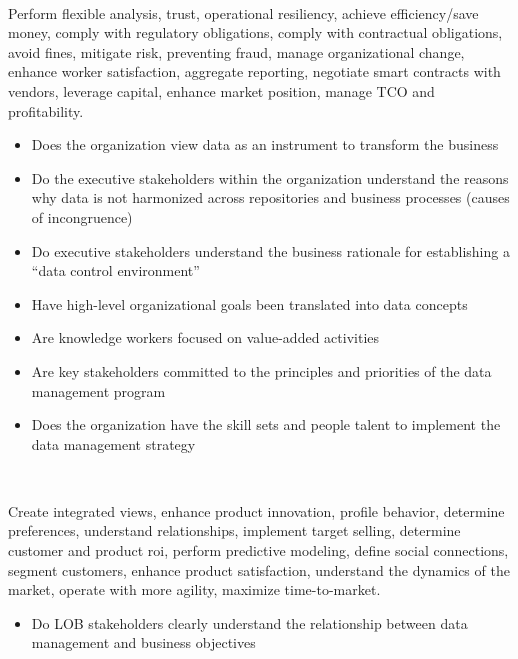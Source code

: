 ~\\

\begin{description}[nosep,font=\bfseries]

  \item [High-level Organizational Goals]
  Perform flexible analysis, trust, operational resiliency, achieve efficiency/\-save money, 
  comply with regulatory obligations, comply with contractual obligations, avoid fines, 
  mitigate risk, preventing fraud, manage organizational change, enhance worker satisfaction,
  aggregate reporting, negotiate smart contracts with vendors, leverage capital, 
  enhance market position, manage TCO and profitability. \\

  \begin{itemize}
    \item Does the organization view data as an instrument to transform the business
    \item Do the executive stakeholders within the organization understand the reasons why data is not harmonized across repositories and business processes (causes of incongruence)
    \item Do executive stakeholders understand the business rationale for establishing a “data control environment”
    \item Have high-level organizational goals been translated into data concepts
    \item Are knowledge workers focused on value-added activities
    \item Are key stakeholders committed to the principles and priorities of the data management program
    \item Does the organization have the skill sets and people talent to implement the data management strategy
  \end{itemize}
  ~\\
  \item [High-Level Business Goals]
  Create integrated views, enhance product innovation, profile behavior, 
  determine preferences, understand relationships, implement target selling, 
  determine customer and product \gls{roi}, perform predictive modeling,
  define social connections, segment customers, enhance product satisfaction, 
  understand the dynamics of the market, operate with more agility, 
  maximize time-to-market.
  ~\\
  \begin{itemize}
    \item Do LOB stakeholders clearly understand the relationship between data management and business objectives

\end{itemize}
\end{description}

